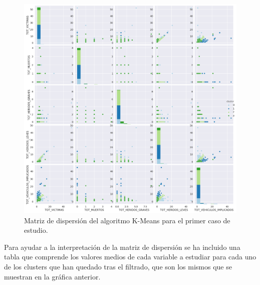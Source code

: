 	\begin{figure}[H]
		\centering
		\includegraphics[scale=0.5]{plots/K-Means-HighwayAccidents-ScatterMatrix.png}
		\caption{Matriz de dispersión del algoritmo K-Means para el primer caso de estudio.}
	\end{figure}

	Para ayudar a la interpretación de la matriz de dispersión se ha incluido una tabla que comprende los valores medios de cada variable a estudiar para cada uno de los clusters que han quedado tras el filtrado, que son los mismos que se muestran en la gráfica anterior.

	\begin{table}[H]
		\centering
		\caption{Tabla de valores medios del algoritmo K-Means para el primer caso de estudio.}
	\end{table}
	
